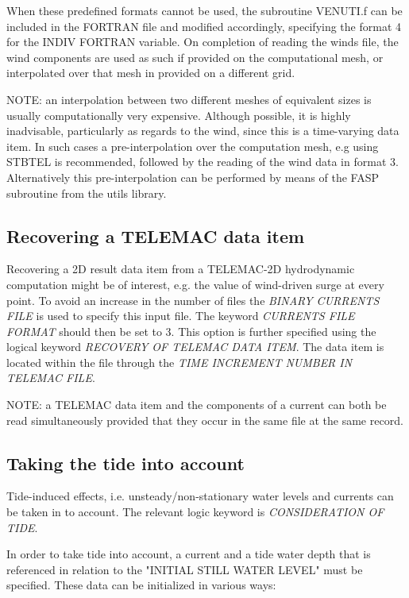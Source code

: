  When these predefined formats cannot be used, the subroutine VENUTI.f can be included in the FORTRAN file and modified accordingly, specifying the format 4 for the INDIV FORTRAN variable. On completion of reading the winds file, the wind components are used as such if provided on the computational mesh, or interpolated over that mesh in provided on a different grid.

 NOTE: an interpolation between two different meshes of equivalent sizes is usually computationally very expensive. Although possible, it is highly inadvisable, particularly as regards to the wind, since this is a time-varying data item. In such cases a pre-interpolation over the computation mesh, e.g using STBTEL is recommended, followed by the reading of the wind data in format 3. Alternatively this pre-interpolation can be performed by means of the FASP subroutine from the utils library.


\subsection{ Recovering a TELEMAC data item}
\label{se:telemacdata}
 Recovering a 2D result data item from a TELEMAC-2D hydrodynamic computation might be of interest, e.g. the value of wind-driven surge at every point. To avoid an increase in the number of files the \textit{BINARY CURRENTS FILE} is used to specify this input file. The keyword \textit{CURRENTS FILE FORMAT} should then be set to 3. This option is further specified using the logical keyword \textit{RECOVERY OF TELEMAC DATA ITEM}. The data item is located within the file through the \textit{TIME INCREMENT NUMBER IN TELEMAC FILE}.

 NOTE: a TELEMAC data item and the components of a current can both be read simultaneously provided that they occur in the same file at the same record.



\subsection{ Taking the tide into account}
\label{se:tide}
 Tide-induced effects, i.e. unsteady/non-stationary water levels and currents can be taken in to account. The relevant logic keyword is \textit{CONSIDERATION OF TIDE}.

 In order to take tide into account, a current and a tide water depth that is referenced in relation to the "INITIAL STILL WATER LEVEL" must be specified. These data can be initialized in various ways:


